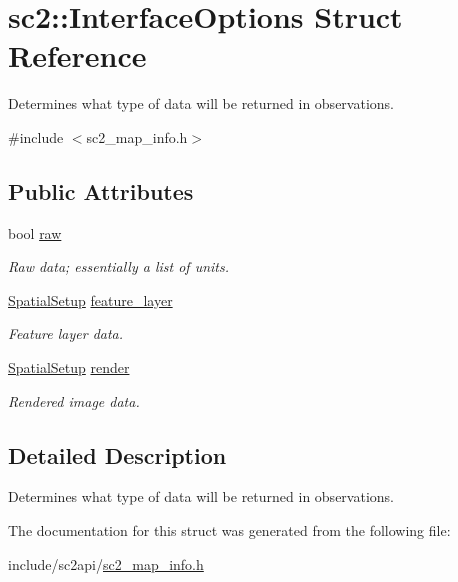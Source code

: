 \hypertarget{structsc2_1_1_interface_options}{}\section{sc2\+:\+:Interface\+Options Struct Reference}
\label{structsc2_1_1_interface_options}


Determines what type of data will be returned in observations.  




{\ttfamily \#include $<$sc2\+\_\+map\+\_\+info.\+h$>$}

\subsection*{Public Attributes}
\begin{DoxyCompactItemize}
\item 
\mbox{\label{structsc2_1_1_interface_options_a363b3c8fc3dade64fe6dc14c095b324e}} 
bool \hyperlink{structsc2_1_1_interface_options_a363b3c8fc3dade64fe6dc14c095b324e}{raw}
\begin{DoxyCompactList}\small\item\em Raw data; essentially a list of units. \end{DoxyCompactList}\item 
\mbox{\label{structsc2_1_1_interface_options_a9ea6db3dbb8243ab70c5caee35f8bd73}} 
\hyperlink{structsc2_1_1_spatial_setup}{Spatial\+Setup} \hyperlink{structsc2_1_1_interface_options_a9ea6db3dbb8243ab70c5caee35f8bd73}{feature\+\_\+layer}
\begin{DoxyCompactList}\small\item\em Feature layer data. \end{DoxyCompactList}\item 
\mbox{\label{structsc2_1_1_interface_options_abf3ca44ff67f031d9d7b6e0346804a0d}} 
\hyperlink{structsc2_1_1_spatial_setup}{Spatial\+Setup} \hyperlink{structsc2_1_1_interface_options_abf3ca44ff67f031d9d7b6e0346804a0d}{render}
\begin{DoxyCompactList}\small\item\em Rendered image data. \end{DoxyCompactList}\end{DoxyCompactItemize}


\subsection{Detailed Description}
Determines what type of data will be returned in observations. 

The documentation for this struct was generated from the following file\+:\begin{DoxyCompactItemize}
\item 
include/sc2api/\hyperlink{sc2__map__info_8h}{sc2\+\_\+map\+\_\+info.\+h}\end{DoxyCompactItemize}
